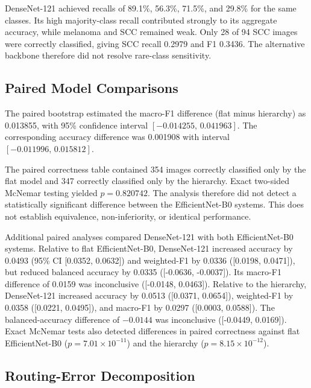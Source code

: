 DenseNet-121 achieved recalls of 89.1\%, 56.3\%, 71.5\%, and 29.8\% for the
same classes. Its high majority-class recall contributed strongly to its
aggregate accuracy, while melanoma and SCC remained weak. Only 28 of 94 SCC
images were correctly classified, giving SCC recall 0.2979 and F1 0.3436.
The alternative backbone therefore did not resolve rare-class sensitivity.

\subsection{Paired Model Comparisons}

The paired bootstrap estimated the macro-F1 difference (flat minus hierarchy)
as 0.013855, with 95\% confidence interval
$[-0.014255,\,0.041963]$. The corresponding accuracy difference was 0.001908
with interval $[-0.011996,\,0.015812]$.

The paired correctness table contained 354 images correctly classified only
by the flat model and 347 correctly classified only by the hierarchy. Exact
two-sided McNemar testing yielded $p=0.820742$. The analysis therefore did not
detect a statistically significant difference between the EfficientNet-B0
systems. This does not establish equivalence, non-inferiority, or identical
performance.

Additional paired analyses compared DenseNet-121 with both EfficientNet-B0
systems. Relative to flat EfficientNet-B0, DenseNet-121 increased accuracy
by 0.0493 (95\% CI [0.0352, 0.0632]) and weighted-F1 by 0.0336
([0.0198, 0.0471]), but reduced balanced accuracy by 0.0335
([-0.0636, -0.0037]). Its macro-F1 difference of 0.0159 was inconclusive
([-0.0148, 0.0463]). Relative to the hierarchy, DenseNet-121 increased
accuracy by 0.0513 ([0.0371, 0.0654]), weighted-F1 by 0.0358
([0.0221, 0.0495]), and macro-F1 by 0.0297 ([0.0003, 0.0588]).
The balanced-accuracy difference of $-0.0144$ was inconclusive
([-0.0449, 0.0169]). Exact McNemar tests also detected differences in
paired correctness against flat EfficientNet-B0 ($p=7.01\times10^{-11}$)
and the hierarchy ($p=8.15\times10^{-12}$).

\subsection{Routing-Error Decomposition}

